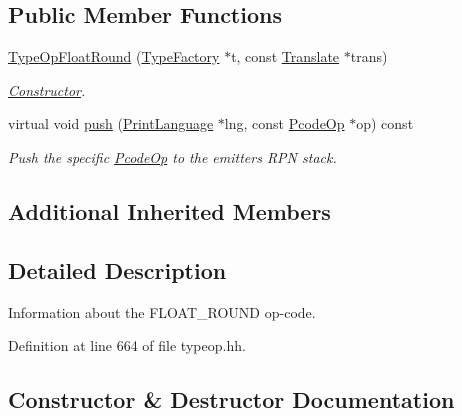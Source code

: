 \subsection*{Public Member Functions}
\begin{DoxyCompactItemize}
\item 
\mbox{\hyperlink{class_type_op_float_round_a791258a866aaa9a96f22ec1ad8bd33c7}{Type\+Op\+Float\+Round}} (\mbox{\hyperlink{class_type_factory}{Type\+Factory}} $\ast$t, const \mbox{\hyperlink{class_translate}{Translate}} $\ast$trans)
\begin{DoxyCompactList}\small\item\em \mbox{\hyperlink{class_constructor}{Constructor}}. \end{DoxyCompactList}\item 
virtual void \mbox{\hyperlink{class_type_op_float_round_ae0b3d766f791e867f8e9f037b9c94d4f}{push}} (\mbox{\hyperlink{class_print_language}{Print\+Language}} $\ast$lng, const \mbox{\hyperlink{class_pcode_op}{Pcode\+Op}} $\ast$op) const
\begin{DoxyCompactList}\small\item\em Push the specific \mbox{\hyperlink{class_pcode_op}{Pcode\+Op}} to the emitter\textquotesingle{}s R\+PN stack. \end{DoxyCompactList}\end{DoxyCompactItemize}
\subsection*{Additional Inherited Members}


\subsection{Detailed Description}
Information about the F\+L\+O\+A\+T\+\_\+\+R\+O\+U\+ND op-\/code. 

Definition at line 664 of file typeop.\+hh.



\subsection{Constructor \& Destructor Documentation}
\mbox{\label{class_type_op_float_round_a791258a866aaa9a96f22ec1ad8bd33c7}} 
